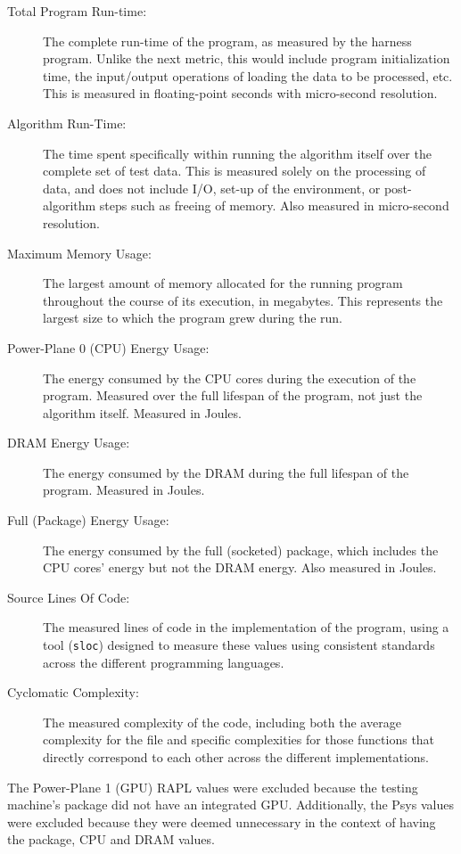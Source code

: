 \begin{description}
\item[Total Program Run-time:] The complete run-time of the program, as measured by the harness program. Unlike the next metric, this would include program initialization time, the input/output operations of loading the data to be processed, etc. This is measured in floating-point seconds with micro-second resolution.
\item[Algorithm Run-Time:] The time spent specifically within running the algorithm itself over the complete set of test data. This is measured solely on the processing of data, and does not include I/O, set-up of the environment, or post-algorithm steps such as freeing of memory. Also measured in micro-second resolution.
\item[Maximum Memory Usage:] The largest amount of memory allocated for the running program throughout the course of its execution, in megabytes. This represents the largest size to which the program grew during the run.
\item[Power-Plane 0 (CPU) Energy Usage:] The energy consumed by the CPU cores during the execution of the program. Measured over the full lifespan of the program, not just the algorithm itself. Measured in Joules.
\item[DRAM Energy Usage:] The energy consumed by the DRAM during the full lifespan of the program. Measured in Joules.
\item[Full (Package) Energy Usage:] The energy consumed by the full (socketed) package, which includes the CPU cores' energy but not the DRAM energy. Also measured in Joules.
\item[Source Lines Of Code:] The measured lines of code in the implementation of the program, using a tool (\texttt{sloc}) designed to measure these values using consistent standards across the different programming languages.
\item[Cyclomatic Complexity:] The measured complexity of the code, including both the average complexity for the file and specific complexities for those functions that directly correspond to each other across the different implementations.
\end{description}

The Power-Plane 1 (GPU) RAPL values were excluded because the testing machine's package did not have an integrated GPU. Additionally, the Psys values were excluded because they were deemed unnecessary in the context of having the package, CPU and DRAM values.

